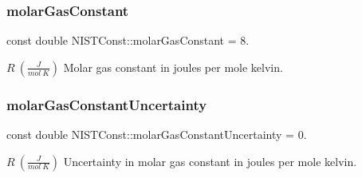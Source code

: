 \subsubsection{\texorpdfstring{molar\+Gas\+Constant}{molarGasConstant}}
{\footnotesize\ttfamily const double N\+I\+S\+T\+Const\+::molar\+Gas\+Constant = 8.}

$R \ (\frac{J}{mol\ K})$ Molar gas constant in joules per mole kelvin. \mbox{\label{group___molar_gas_constant_ga0b24ac606a3ba6a685599a78586fbc77}} 
\subsubsection{\texorpdfstring{molar\+Gas\+Constant\+Uncertainty}{molarGasConstantUncertainty}}
{\footnotesize\ttfamily const double N\+I\+S\+T\+Const\+::molar\+Gas\+Constant\+Uncertainty = 0.}

$R \ (\frac{J}{mol\ K})$ Uncertainty in molar gas constant in joules per mole kelvin. 